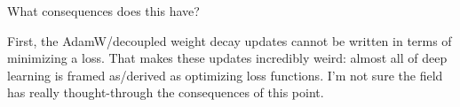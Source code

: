 \documentclass{article}
\newcommand{\bracket}[3]{\left#1 #3 \right#2}
\newcommand{\ab}{\bracket{\langle}{\rangle}}
\newcommand{\0}{\mathbf{0}}
\newcommand{\greg}{g_\text{reg}}
\newcommand{\gunreg}{g_\text{unreg}}
\begin{document}
What consequences does this have?

First, the AdamW/decoupled weight decay updates cannot be written in terms of minimizing a loss.
That makes these updates incredibly weird: almost all of deep learning is framed as/derived as optimizing loss functions.
I'm not sure the field has really thought-through the consequences of this point.



\end{document}
